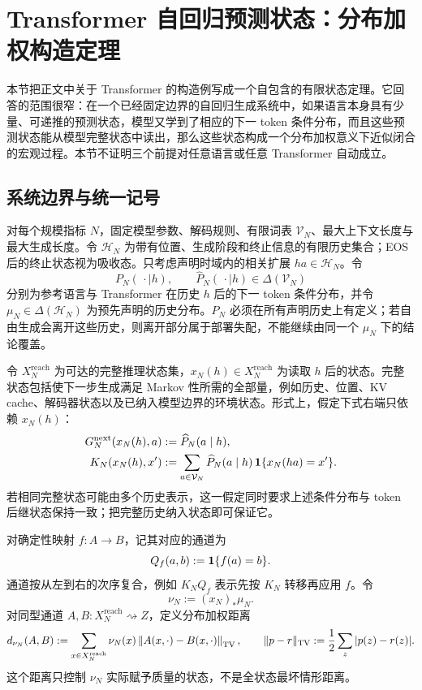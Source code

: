 \section{Transformer 自回归预测状态：分布加权构造定理}
\label{app:transformer-predictive-states}
\label{supp:transformer}

本节把正文中关于 Transformer 的构造例写成一个自包含的有限状态定理。它回答的范围很窄：在一个已经固定边界的自回归生成系统中，如果语言本身具有少量、可递推的预测状态，模型又学到了相应的下一 token 条件分布，而且这些预测状态能从模型完整状态中读出，那么这些状态构成一个分布加权意义下近似闭合的宏观过程。本节不证明三个前提对任意语言或任意 Transformer 自动成立。

\subsection{系统边界与统一记号}

对每个规模指标 $N$，固定模型参数、解码规则、有限词表 $\mathcal V_N$、最大上下文长度与最大生成长度。令 $\mathcal H_N$ 为带有位置、生成阶段和终止信息的有限历史集合；EOS 后的终止状态视为吸收态。只考虑声明时域内的相关扩展 $ha\in\mathcal H_N$。令
\[
 P_N(\,\cdot\mid h),\qquad \widehat P_N(\,\cdot\mid h)
 \in\Delta(\mathcal V_N)
\]
分别为参考语言与 Transformer 在历史 $h$ 后的下一 token 条件分布，并令 $\mu_N\in\Delta(\mathcal H_N)$ 为预先声明的历史分布。$P_N$ 必须在所有声明历史上有定义；若自由生成会离开这些历史，则离开部分属于部署失配，不能继续由同一个 $\mu_N$ 下的结论覆盖。

令 $X_N^{\mathrm{reach}}$ 为可达的完整推理状态集，$x_N(h)\in X_N^{\mathrm{reach}}$ 为读取 $h$ 后的状态。完整状态包括使下一步生成满足 Markov 性所需的全部量，例如历史、位置、KV cache、解码器状态以及已纳入模型边界的环境状态。形式上，假定下式右端只依赖 $x_N(h)$：
\[
 \begin{aligned}
 G_N^{\mathrm{next}}(x_N(h),a)
   &:=\widehat P_N(a\mid h),\\
 K_N(x_N(h),x')
   &:=\sum_{a\in\mathcal V_N}
      \widehat P_N(a\mid h)\,
      \mathbf 1\{x_N(ha)=x'\}.
 \end{aligned}
\]
若相同完整状态可能由多个历史表示，这一假定同时要求上述条件分布与 token 后继状态保持一致；把完整历史纳入状态即可保证它。

对确定性映射 $f:A\to B$，记其对应的通道为
\[
 Q_f(a,b):=\mathbf 1\{f(a)=b\}.
\]
通道按从左到右的次序复合，例如 $K_NQ_f$ 表示先按 $K_N$ 转移再应用 $f$。令
\[
 \nu_N:=(x_N)_*\mu_N.
\]
对同型通道 $A,B:X_N^{\mathrm{reach}}\rightsquigarrow Z$，定义分布加权距离
\[
 d_{\nu_N}(A,B)
 :=\sum_{x\in X_N^{\mathrm{reach}}}\nu_N(x)
   \left\|A(x,\cdot)-B(x,\cdot)\right\|_{\operatorname{TV}},
 \qquad
 \|p-r\|_{\operatorname{TV}}:=\frac12\sum_z|p(z)-r(z)|.
\]
这个距离只控制 $\nu_N$ 实际赋予质量的状态，不是全状态最坏情形距离。

